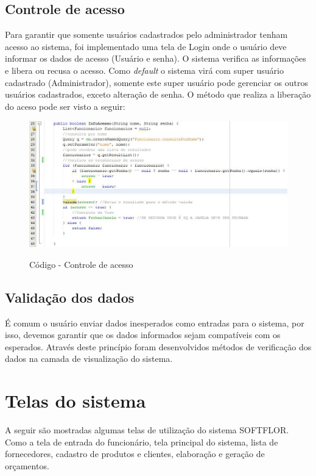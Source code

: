     \subsection{Controle de acesso}
    
    Para garantir que somente usuários cadastrados pelo administrador tenham acesso ao sistema, foi implementado uma tela de Login onde o usuário deve informar os dados de acesso (Usuário e senha). O sistema verifica as informações e libera ou recusa o acesso. Como \textit{default} o sistema virá com super usuário cadastrado (Administrador), somente este super usuário pode gerenciar os outros usuários cadastrados, exceto alteração de senha. O método que realiza a liberação do aceso pode ser visto a seguir:
    
\begin{figure}[h]
\centering
\caption{Código - Controle de acesso}
\includegraphics[width=15cm]{imagens/codigo/TrechoAcesso}
\label{fig:Controle de acesso}
\end{figure}
    
     \subsection{Validação dos dados}
     É comum o usuário enviar dados inesperados como entradas para o sistema, por isso, devemos garantir que os dados informados sejam compatíveis com os esperados. Através deste princípio foram desenvolvidos métodos de verificação dos dados na camada de visualização do sistema.
     
    
    
\section{Telas do sistema}
A seguir são mostradas algumas telas de utilização do sistema SOFTFLOR. Como a tela de entrada do funcionário, tela principal do sistema, lista de fornecedores, cadastro de produtos e clientes, elaboração e geração de orçamentos.
